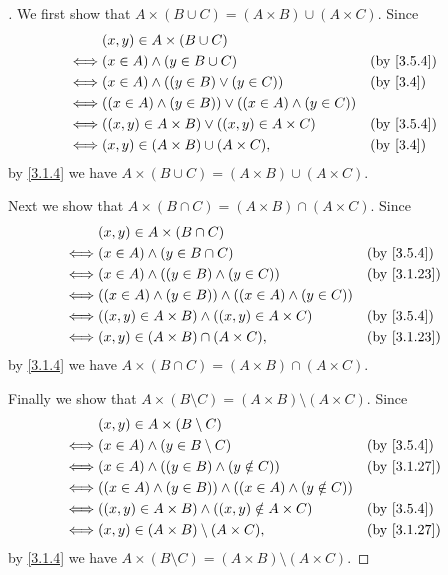 \begin{proof}[]
	We first show that \(A \times (B \cup C) = (A \times B) \cup (A \times C)\).
	Since
	\begin{align*}
		     & (x, y) \in A \times (B \cup C)                                               \\
		\iff & (x \in A) \land (y \in B \cup C)                             &  & \by{3.5.4} \\
		\iff & (x \in A) \land ((y \in B) \lor (y \in C))                   &  & \by{3.4}   \\
		\iff & ((x \in A) \land (y \in B)) \lor ((x \in A) \land (y \in C))                 \\
		\iff & ((x, y) \in A \times B) \lor ((x, y) \in A \times C)         &  & \by{3.5.4} \\
		\iff & (x, y) \in (A \times B) \cup (A \times C),                   &  & \by{3.4}
	\end{align*}
	by \cref{3.1.4} we have \(A \times (B \cup C) = (A \times B) \cup (A \times C)\).

	Next we show that \(A \times (B \cap C) = (A \times B) \cap (A \times C)\).
	Since
	\begin{align*}
		     & (x, y) \in A \times (B \cap C)                                                 \\
		\iff & (x \in A) \land (y \in B \cap C)                              &  & \by{3.5.4}  \\
		\iff & (x \in A) \land ((y \in B) \land (y \in C))                   &  & \by{3.1.23} \\
		\iff & ((x \in A) \land (y \in B)) \land ((x \in A) \land (y \in C))                  \\
		\iff & ((x, y) \in A \times B) \land ((x, y) \in A \times C)         &  & \by{3.5.4}  \\
		\iff & (x, y) \in (A \times B) \cap (A \times C),                    &  & \by{3.1.23}
	\end{align*}
	by \cref{3.1.4} we have \(A \times (B \cap C) = (A \times B) \cap (A \times C)\).

	Finally we show that \(A \times (B \setminus C) = (A \times B) \setminus (A \times C)\).
	Since
	\begin{align*}
		     & (x, y) \in A \times (B \setminus C)                                               \\
		\iff & (x \in A) \land (y \in B \setminus C)                            &  & \by{3.5.4}  \\
		\iff & (x \in A) \land ((y \in B) \land (y \notin C))                   &  & \by{3.1.27} \\
		\iff & ((x \in A) \land (y \in B)) \land ((x \in A) \land (y \notin C))                  \\
		\iff & ((x, y) \in A \times B) \land ((x, y) \notin A \times C)         &  & \by{3.5.4}  \\
		\iff & (x, y) \in (A \times B) \setminus (A \times C),                  &  & \by{3.1.27}
	\end{align*}
	by \cref{3.1.4} we have \(A \times (B \setminus C) = (A \times B) \setminus (A \times C)\).
\end{proof}


